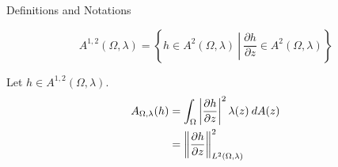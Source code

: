 \documentclass{reu_beamer}
\begin{document}
\begin{frame}{Definitions and Notations}
    \begin{definition}
        \[A^{1,2}(\Omega,\lambda) = \left\{h \in A^{2}(\Omega,\lambda)\ \left|\ \frac{\partial h}{\partial z} \in A^2(\Omega,\lambda)\right.\right\}\]
    \end{definition}

    \begin{definition}
        Let $h\in A^{1,2}(\Omega,\lambda)$.
        \begin{align*}
            A_{\Omega,\lambda}(h) &= \int_{\Omega}\left\vert \frac{\partial h}{\partial z}\right\vert^2 \lambda(z)\:dA(z)\\
                                  &= \left\Vert \frac{\partial h}{\partial z} \right\Vert_{L^{2}\left(\Omega,\lambda\right)}^{2}
        \end{align*}
    \end{definition}
\end{frame}
\end{document}
